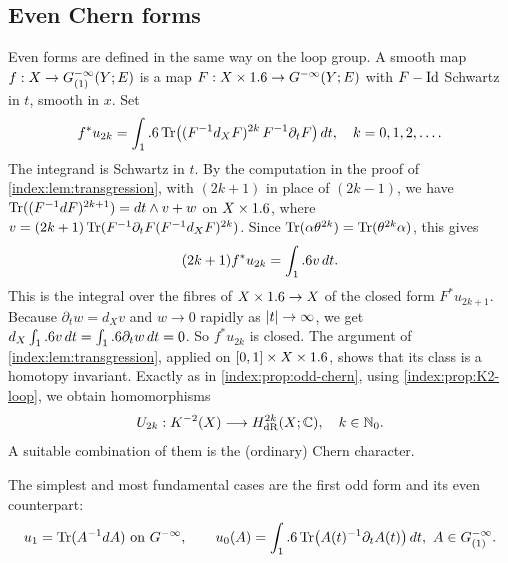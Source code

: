 \subsection{Even Chern forms}
Even forms are defined in the same way on the loop group. A smooth map
$f:X\to G^{-\infty}_{(1)}(Y;E)$ is a map $F:X\times1.6\to G^{-\infty}(Y;E)$ with $F-\operatorname{Id}$
Schwartz in $t$, smooth in $x$. Set
\begin{equation}\label{index:eq:even-forms}
  f^*u_{2k}=\int_1.6\operatorname{Tr}\bigl((F^{-1}d_XF)^{2k}\,F^{-1}\partial_tF\bigr)\,dt,
  \quad k=0,1,2,\dots.
\end{equation}
The integrand is Schwartz in $t$. By the computation in the proof of
\cref{index:lem:transgression}, with $(2k+1)$ in place of $(2k-1)$, we have
$\operatorname{Tr}((F^{-1}dF)^{2k+1})=dt\wedge v+w$ on $X\times1.6$, where
$v=(2k+1)\operatorname{Tr}(F^{-1}\partial_tF(F^{-1}d_XF)^{2k})$. Since
$\operatorname{Tr}(\alpha\theta^{2k})=\operatorname{Tr}(\theta^{2k}\alpha)$, this gives
\begin{equation*}
  (2k+1)f^*u_{2k}=\int_1.6 v\,dt.
\end{equation*}
This is the integral over the fibres of $X\times1.6\to X$ of the closed form
$F^*u_{2k+1}$. Because $\partial_tw=d_Xv$ and $w\to0$ rapidly as
$\lvert t\rvert\to\infty$, we get $d_X\int_1.6 v\,dt=\int_1.6\partial_tw\,dt=0$. So
$f^*u_{2k}$ is closed. The argument of \cref{index:lem:transgression},
applied on $[0,1]\times X\times1.6$, shows that its class is a homotopy
invariant. Exactly as in \cref{index:prop:odd-chern}, using
\cref{index:prop:K2-loop}, we obtain homomorphisms
\begin{equation*}
  U_{2k}:K^{-2}(X)\longrightarrow H^{2k}_{\mathrm{dR}}(X;\mathbb{C}),\quad k\in\mathbb{N}_0.
\end{equation*}
A suitable combination of them is the (ordinary) Chern character.

The simplest and most fundamental cases are the first odd form and its even
counterpart:
\begin{equation}\label{index:eq:u1-u0}
  u_1=\Tr(A^{-1}dA)\ \text{on }\Ginf,\qquad
  u_0(A)=\int_\R\Tr\bigl(A(t)^{-1}\partial_tA(t)\bigr)\,dt,\ A\in\Gloop.
\end{equation}

